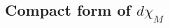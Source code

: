 \documentclass{sig-alternate-05-2015}
\DeclareMathOperator{\com}{Com}
\def\todo#1{\ \!\!{\color{red} #1}}
\begin{document}
\begin{comment}
\begin{prop} \label{prop:factor_com}
Let $M \in M_n (O_K)$ be such that $discr(\chi (M)) \neq 0.$
We assume that $A=\com (X-M)$ is such that $gcd(A_{1,1}, \chi (M))=1$
(in $K[X]$).
Then for $U=col(A,1)$ and $V=A_{1,1}^{-1} row(A,1) \mod \chi (M),$
both in $O_K[X]^n,$ we have: 
\[ \com (X-M)= U \cdot {}^t V \mod \chi (M).\]
\todo{I think that the correct condition is $d \chi_M$ surjective (which
is a bit weaker).}
\end{prop}


\begin{proof}
We first prove that for all $i,j \in \llbracket 1, n \rrbracket,$ we have
\begin{equation}A_{1,1} A_{i,j}=A_{1,i}A_{1,j} \mod \chi (M). \label{eqn:2-minors-com} \end{equation}
Let $\lambda$ be a root of $\chi (M)$ in an algebraic closure of $K.$
Then $A(\lambda)$ is of rank one.
Indeed, $A(\lambda) \times (\lambda-M) =0.$
Since $\chi (M)$ is square-free, then $\lambda-M$ is of rank $n-1$
and then $A(\lambda)$ is of rank at most one.
Nevertheless, we can remark that
 $gcd(A_{1,1}, \chi (M))=1,$ $A_{1,1} \neq 0 \mod (X-\lambda)$
and thus, $A(\lambda)$ is of rank exactly one.
As a consequence, all $2 \times 2$-minors of $A(\lambda)$ are zero.
It means that \[A_{1,1} A_{i,j}=A_{1,i}A_{1,j} \mod (X-\lambda). \]
By the Chinese Remainder Theorem, our first result is then proved.

Now, let us take $U=col(A,1)$ the first column of $A$ and
$V=A_{1,1}^{-1} row(A,1) \mod \chi (M)$ (as $A_{1,1}$ is
invertible $\mod \chi (M)).$
Then thanks to \eqref{eqn:2-minors-com}, $U$ and $V$ satisfy the desired equality. 
\end{proof}

\begin{rem}
If $M \in M_n (O_K)$ is such that for some $U,V \in O_{K}[X]^n$
we have $\com (X-M)= U \cdot {}^t V \mod \chi (M)$ and if 
$P\in GL_n (O_K)$ then
\[\com (X-PMP^{-1})=(PU) \cdot ( {}^tV P^{-1}) \mod \chi(M).\]
In other words, factorizability of $\com(X-M)$ is stable
by change of basis.
\end{rem}
\end{comment}

\subsection{Compact form of $d \chi_M$}
\end{document}
